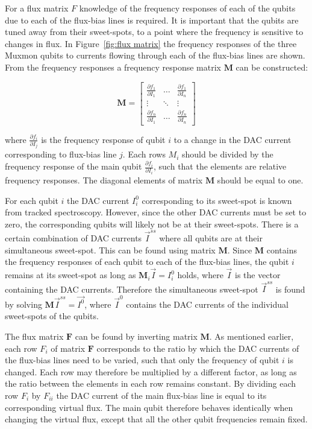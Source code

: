         For a flux matrix $F$ knowledge of the frequency responses of each of the qubits due to each of the flux-bias lines is required. It is important that the qubits are tuned away from their sweet-spots, to a point where the frequency is sensitive to changes in flux. In Figure~\ref{fig:flux matrix} the frequency responses of the three Muxmon qubits to currents flowing through each of the flux-bias lines are shown. From the frequency responses a frequency response matrix $\boldsymbol{M}$ can be constructed:

        \begin{equation}
          \boldsymbol{M} =
          \begin{bmatrix}
            \frac{\partial f_1}{\partial I_1} & \dots & \frac{\partial f_1}{\partial I_n} \\
            \vdots & \ddots & \vdots \\
            \frac{\partial f_n}{\partial I_1} & \dots & \frac{\partial f_n}{\partial I_n}
          \end{bmatrix}
        \end{equation}

        where $\frac{\partial f_i}{\partial I_j}$ is the frequency response of qubit $i$ to a change in the DAC current corresponding to flux-bias line $j$. Each rows $M_i$ should be divided by the frequency response of the main qubit $\frac{\partial f_i}{\partial I_i}$, such that the elements are relative frequency responses. The diagonal elements of matrix $\boldsymbol{M}$ should be equal to one.

        For each qubit $i$ the DAC current $I^0_i$ corresponding to its sweet-spot is known from tracked spectroscopy. However, since the other DAC currents must be set to zero, the corresponding qubits will likely not be at their sweet-spots. There is a certain combination of DAC currents $\vec{I}^{ss}$ where all qubits are at their simultaneous sweet-spot. This can be found using matrix $\boldsymbol{M}$. Since $\boldsymbol{M}$ contains the frequency responses of each qubit to each of the flux-bias lines, the qubit $i$ remains at its sweet-spot as long as $\boldsymbol{M}_i \vec{I}=I^0_i$ holds, where $\vec{I}$ is the vector containing the DAC currents. Therefore the simultaneous sweet-spot $\vec{I}^{ss}$ is found by solving $\boldsymbol{M} \vec{I}^{ss} = \vec{I^0}$, where $\vec{I}^0$ contains the DAC currents of the individual sweet-spots of the qubits.

        The flux matrix $\boldsymbol{F}$ can be found by inverting matrix $\boldsymbol{M}$. As mentioned earlier, each row $F_i$ of matrix $\boldsymbol{F}$ corresponds to the ratio by which the DAC currents of the flux-bias lines need to be varied, such that only the frequency of qubit $i$ is changed. Each row may therefore be multiplied by a different factor, as long as the ratio between the elements in each row remains constant. By dividing each row $F_i$ by $F_{ii}$ the DAC current of the main flux-bias line is equal to its corresponding virtual flux. The main qubit therefore behaves identically when changing the virtual flux, except that all the other qubit frequencies remain fixed.

